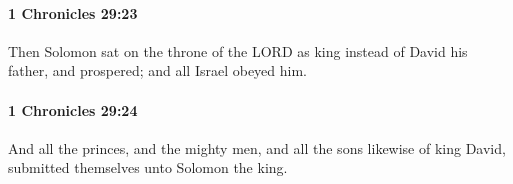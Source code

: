 		\paragraph{1 Chronicles 29:23} %
			\label{1CHRONICLES-29-23}

			Then Solomon sat on the throne of the LORD as king instead of David his father, and prospered; and all Israel obeyed him.


		\paragraph{1 Chronicles 29:24} %
			\label{1CHRONICLES-29-24}

			And all the princes, and the mighty men, and all the sons likewise of king David, submitted themselves unto Solomon the king.


